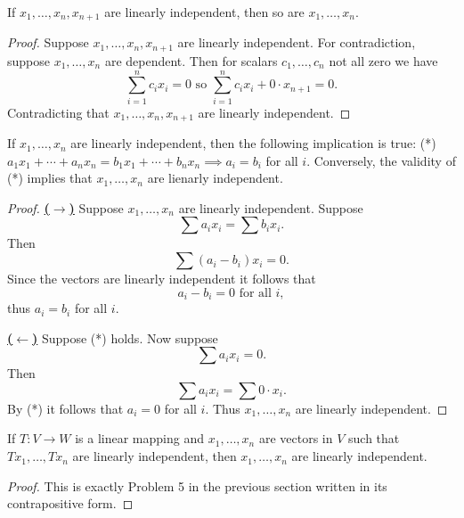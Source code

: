 \begin{tcolorbox}[title=Problem 2, breakable]
    If $x_1, \ldots, x_n, x_{n + 1}$ are linearly 
    independent, then so are $x_1, \ldots, x_n$.
\end{tcolorbox}

\begin{proof}
    Suppose $x_1, \ldots, x_n, x_{n + 1}$ are linearly 
    independent.
    For contradiction, suppose $x_1, \ldots, x_n$
    are dependent.
    Then for scalars $c_1, \ldots, c_n$ not all zero we have 
    \[\sum_{i=1}^n c_i x_i = 0 \text{ so } \sum_{i=1}^n c_i x_i + 0\cdot x_{n + 1} = 0.\]
    Contradicting that $x_1, \ldots, x_n, x_{n + 1}$ are linearly independent.
\end{proof}


\begin{tcolorbox}[title=Problem 3, breakable]
    If $x_1, \ldots, x_n$ are linearly independent,
    then the following implication is true:
    (*) $a_1 x_1 + \cdots + a_n x_n = b_1 x_1 + \cdots + b_n x_n \implies a_i = b_i$ for all $i$.
    Conversely, the validity of (*) implies that $x_1, \ldots, x_n$ are lienarly independent.
\end{tcolorbox}

\begin{proof}
    \underline{\textbf{($\longrightarrow$)}}
    Suppose $x_1, \ldots, x_n$ are linearly independent.
    Suppose 
    \[\sum a_i x_i = \sum b_i x_i.\]
    Then
    \[\sum (a_i - b_i)x_i = 0.\]
    Since the vectors are linearly independent it follows that 
    \[a_i - b_i = 0 \text{ for all } i,\]
    thus $a_i = b_i$ for all $i$.

    \underline{\textbf{($\longleftarrow$)}}
    Suppose (*) holds. Now suppose
    \[\sum a_i x_i = 0.\]
    Then
    \[\sum a_i x_i = \sum 0 \cdot x_i.\]
    By (*) it follows that $a_i = 0$ for all $i$. Thus $x_1, \ldots, x_n$
    are linearly independent.
\end{proof}

\begin{tcolorbox}[title=Problem 6, breakable]
    If $T : V \longrightarrow W$ is a linear mapping and 
    $x_1, \ldots, x_n$ are vectors in $V$ such that 
    $Tx_1, \ldots, Tx_n$ are linearly independent, then 
    $x_1, \ldots, x_n$ are linearly independent.
\end{tcolorbox}

\begin{proof}
    This is exactly Problem 5 in the previous section written in its contrapositive form.
\end{proof}

